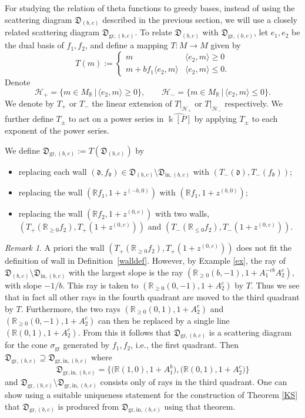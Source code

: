 \documentclass[12pt]{amsart}
\theoremstyle{remark}
\newtheorem{remark}[theorem]{Remark}
\newcommand{\RR}{\mathbb{R}}
\newcommand{\fod}{\mathfrak{d}}
\newcommand{\DD}{\mathfrak{D}}
\newcommand{\gr}{\mathrm{gr}}
\begin{document}
For studying the relation of theta functions to greedy bases,
instead of using the scattering diagram $\DD_{(b,c)}$ described in the
previous section, we will use a closely related scattering diagram 
$\DD_{\mathrm{gr},(b,c)}$.
To relate $\DD_{(b,c)}$ with $\DD_{\gr,(b,c)}$, let $e_1,e_2$ be the
dual basis of $f_1, f_2$, and define a mapping 
$T:M \rightarrow M$ given by
\[
T (m) := 
\begin{cases}
    m   & \langle e_2 , m \rangle \geq 0 \\
    m + b f_1 \langle e_2, m \rangle & \langle e_2, m \rangle \leq 0.
\end{cases}
\]
Denote
\[ \mathcal{H}_{+} = \{  m \in M_{\mathbb{R}}\, |\, \langle e_2 , m \rangle \geq 0  \}, \qquad \mathcal{H}_{-} = \{  m \in M_{\mathbb{R}} \,|\, \langle e_2 , m \rangle \leq 0  \}.\]
We denote by $T_+$ or $T_-$ the linear extension of $T|_{\mathcal{H}_+}$
or $T|_{\mathcal{H}_-}$ respectively.
We further define $T_{\pm}$ to act on a power 
series in $\widehat{\Bbbk[P]}$ by applying $T_{\pm}$ to each exponent of the 
power series. 

We define $\DD_{\gr,(b,c)} := T(\DD_{(b,c)})$ by 
\begin{itemize}
    \item replacing each wall $(\fod,f_{\fod})\in \DD_{(b,c)}\setminus
\DD_{\mathrm{in},(b,c)}$ with $(T_-(\fod), T_-(f_{\fod}))$;
    \item replacing the wall $(\RR f_1, 1+z^{(-b,0)})$ with 
$(\RR f_1, 1+z^{(b,0)})$;
    \item replacing the wall $(\RR f_2, 1+z^{(0,c)})$ with two walls,
$(T_+(\RR_{\ge 0} f_2), T_+(1+z^{(0,c)}))$ and $(T_-(\RR_{\le 0}f_2),
T_-(1+z^{(0,c)}))$.
\end{itemize}

\begin{remark}
A priori the wall $(T_+(\RR_{\ge 0}f_2),T_+(1+z^{(0,c)}))$ does not
fit the definition of wall in Definition~\ref{walldef}. However, 
by Example \ref{ex}, the ray of $\DD_{(b,c)}\setminus
\DD_{\mathrm{in},(b,c)}$ with the largest slope is the ray
$(\RR_{\ge 0} (b,-1),1+A_1^{-cb}A_2^c)$, with slope $-1/b$. This ray 
is taken to  $(\RR_{\ge 0}(0,-1),1+A_2^c)$ by $T$. 
Thus we see that in fact all other rays in the 
fourth quadrant are moved to the third quadrant by $T$. 
Furthermore, the two
rays $(\RR_{\ge 0} (0,1), 1+A_2^c)$ and $(\RR_{\ge 0}(0,-1), 1+A_2^c)$
can then be replaced by a single line $(\RR (0,1), 1+A_2^c)$. 
From this it follows that
$\DD_{\gr,(b,c)}$ is a scattering diagram for the cone $\sigma_{\gr}$
generated by $f_1, f_2$, i.e., the first quadrant. 
Then $\DD_{\gr,(b,c)}\supseteq\DD_{\gr,\mathrm{in},(b,c)}$ where
\[
\DD_{\gr,\mathrm{in},(b,c)}=\big\{\big(\RR(1,0), 1+A_1^b\big), 
\big(\RR (0,1), 1+A_2^c\big)\big\}
\]
and 
$\DD_{\gr,(b,c)}\setminus\DD_{\gr,\mathrm{in},(b,c)}$ consists only of rays
in the third quadrant. One can show using a suitable uniqueness statement
for the construction of Theorem \ref{KS} that $\DD_{\gr,(b,c)}$
is produced from $\DD_{\gr,\mathrm{in},(b,c)}$ using that theorem.
\end{remark}
\end{document}
